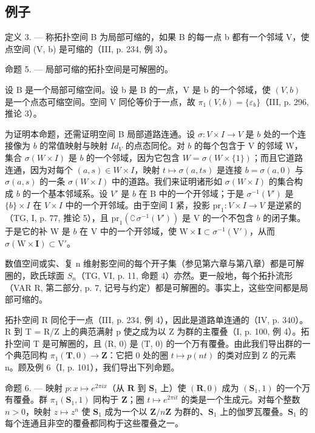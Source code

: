 \subsection{例子}


定义 3. --- 称拓扑空间 B 为局部可缩的，如果 B 的每一点 b 都有一个邻域 V，使点空间 (V, b) 是可缩的（III, p. 234, 例 3）。

命题 5. --- 局部可缩的拓扑空间是可解圈的。

设 B 是一个局部可缩空间。设 b 是 B 的一点，V 是 b 的一个邻域，使 \((V, b)\) 是一个点态可缩空间。空间 V 同伦等价于一点，故 \(\pi_{1}(V, b) = \{\varepsilon_{b}\}\)（III, p. 296, 推论 3）。

为证明本命题，还需证明空间 B 局部道路连通。设 \(\sigma: V \times I \to V\) 是 \(b\) 处的一个连接像为 \(b\) 的常值映射与映射 \(Id_V\) 的点态同伦。对 \(b\) 的每个包含于 V 的邻域 W，集合 \(\sigma(W \times I)\) 是 \(b\) 的一个邻域，因为它包含 \(W = \sigma(W \times \{1\})\)；而且它道路连通，因为对每个 \((a, s) \in W \times I\)，映射 \(t \mapsto \sigma(a, ts)\) 是连接 \(b = \sigma(a, 0)\) 与 \(\sigma(a, s)\) 的一条 \(\sigma(W \times I)\) 中的道路。我们来证明诸形如 \(\sigma(W \times I)\) 的集合构成 \(b\) 的一个基本邻域系。设 \(V'\) 是 \(b\) 在 B 中的一个开邻域；于是 \(\sigma^{-1}(V')\) 是 \(\{b\} \times I\) 在 \(V \times I\) 中的一个开邻域。由于空间 I 紧，投影 \(\mathrm{pr}_1: V \times I \to V\) 是逆紧的（TG, I, p. 77, 推论 5），且 \(\mathrm{pr}_1(\complement\,\sigma^{-1}(V'))\) 是 V 的一个不包含 \(b\) 的闭子集。于是它的补 W 是 \(b\) 在 V 中的一个开邻域，使 \(\mathrm{W} \times \mathbf{I} \subset \sigma^{-1}(\mathrm{V}')\)，从而 \(\sigma(\mathrm{W} \times \mathbf{I}) \subset \mathrm{V}'\)。

数值空间或实、复 n 维射影空间的每个开子集（参见第六章与第八章）都是可解圈的，欧氏球面 \(S_{n}\)（TG, VI, p. 11, 命题 4）亦然。更一般地，每个拓扑流形（VAR R, 第二部分, p. 7, 记号与约定）都是可解圈的。事实上，这些空间都是局部可缩的。


拓扑空间 R 同伦于一点（III, p. 234, 例 4），因此是道路单连通的（IV, p. 340）。R 到 T = R/Z 上的典范满射 p 使之成为以 Z 为群的主覆叠（I, p. 100, 例 4）。拓扑空间 T 是可解圈的，且 (R, 0) 是 (T, 0) 的一个万有覆叠。由此我们导出群的一个典范同构 \(\pi_{1}(\mathbf{T}, 0) \to \mathbf{Z}\)：它把 0 处的圈 \(t \mapsto p(nt)\) 的类对应到 Z 的元素 n。顾及例 6（I, p. 101），我们导出下列命题。

命题 6. --- 映射 \(p \colon x \mapsto e^{2\pi ix}\)（从 \(\mathbf{R}\) 到 \(\mathbf{S}_1\) 上）使 \((\mathbf{R}, 0)\) 成为 \((\mathbf{S}_1, 1)\) 的一个万有覆叠。群 \(\pi_1(\mathbf{S}_1, 1)\) 同构于 \(\mathbf{Z}\)；圈 \(t \mapsto e^{2\pi it}\) 的类是一个生成元。对每个整数 \(n > 0\)，映射 \(z \mapsto z^n\) 使 \(\mathbf{S}_1\) 成为一个以 \(\mathbf{Z}/n\mathbf{Z}\) 为群的、\(\mathbf{S}_1\) 上的伽罗瓦覆叠。\(\mathbf{S}_1\) 的每个连通且非空的覆叠都同构于这些覆叠之一。

